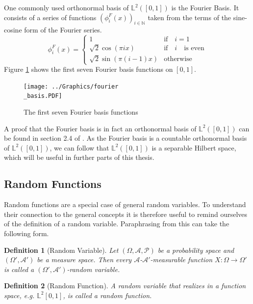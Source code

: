 \documentclass[12pt, a4paper]{article}
\theoremstyle{MAstyle} \newtheorem{assumption}{Assumption}[section]
\theoremstyle{MAstyle} \newtheorem{definition}{Definition}[section]
\theoremstyle{MAstyle} \newtheorem{theorem}{Theorem}[section]
\begin{document}
			One commonly used orthonormal basis of $\mathbb{L}^2([0,1])$ is the Fourier Basis. It consists of a series of functions $\left(\phi_{i}^{F}(x)\right)_{i \in \mathbb{N}}$ taken from the terms of the sine-cosine form of the Fourier series.
			\begin{equation}
				\phi_{i}^{F}(x) = 
				\begin{cases}
					1 & \text{if} \quad i = 1\\
					\sqrt{2} \cos(\pi i x) & \text{if} \quad i \quad \text{is even} \\
					\sqrt{2} \sin(\pi (i-1)x) & \text{otherwise}
				\end{cases}
			\end{equation}
			Figure \ref{fourier_basis} shows the first seven Fourier basis functions on $[0,1]$.
			\begin{figure}[H]
				\texttt{[image: ../Graphics/fourier\\\_basis.PDF]}
				\caption{The first seven Fourier basis functions}
				\label{fourier_basis}
			\end{figure}
			A proof that the Fourier basis is in fact an orthonormal basis of $\mathbb{L}^2([0,1])$ can be found in section 2.4 of \cite{hsing_theoretical_2015}. As the Fourier basis is a countable orthonormal basis of $\mathbb{L}^2([0,1])$, we can follow that $\mathbb{L}^2([0,1])$ is a separable Hilbert space, which will be useful in further parts of this thesis.
	
		\subsection{Random Functions}
			Random functions are a special case of general random variables. To understand their connection to the general concepts it is therefore useful to remind ourselves of the definition of a random variable. Paraphrasing from \cite{bauer_probability_2011} this can take the following form.
			\begin{definition}[Random Variable]
				Let $\left(\Omega, \mathcal{A}, \mathcal{P}\right)$ be a probability space and $\left(\Omega', \mathcal{A}'\right)$ be a measure space. Then every $\mathcal{A}$-$\mathcal{A}'$-measurable function $X:\Omega \rightarrow \Omega'$ is called a $\left(\Omega', \mathcal{A}'\right)$-random variable.
			\end{definition}
		
			\begin{definition}[Random Function]
				A random variable that realizes in a function space, e.g. $\mathbb{L}^2[0,1]$, is called a random function.
			\end{definition}
		
\end{document}
